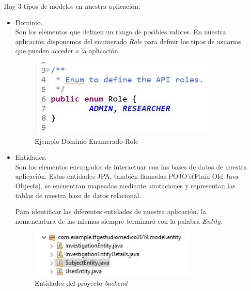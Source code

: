 \begin{itemize}
            Hay 3 tipos de modelos en nuestra aplicación:
            \begin{itemize}
                \item Dominio. \\
                Son los elementos que definen un rango de posibles valores. En nuestra aplicación disponemos del enumerado  \textit{Role} para definir los tipos de usuarios que pueden acceder a la aplicación.
                \newline
                
                 \begin{figure}[h]
                \centering
                \includegraphics[width=0.9\textwidth]{images/role.JPG}
                \caption{Ejemplo Dominio Enumerado Role}
                \end{figure}
                
              
                \item Entidades.  \\
                Son los elementos encargados de interactuar con las bases de datos de nuestra aplicación. Estas entidades JPA, también llamadas POJO's(Plain Old Java Objects), se encuentran mapeadas mediante anotaciones y representan las tablas de nuestra base de datos relacional.
                \newline
                
                
            Para identificar las diferentes entidades de nuestra aplicación, la nomenclatura de las mismas siempre terminará con la palabra \textit{Entity}.
            \newline
                
                  \begin{figure}[h]
                        \centering
                        \includegraphics[width=0.8\textwidth]{images/entity.JPG}
                        \caption{Entidades del proyecto \textit{backend}}
                    \end{figure}
            

\end{itemize}
\end{itemize}

